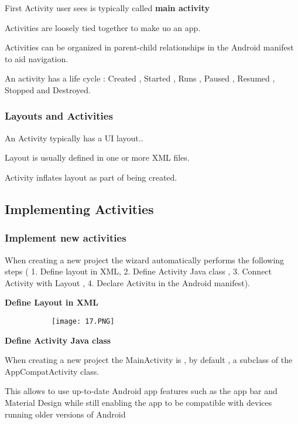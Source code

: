 \documentclass{article}
\begin{document}
  First Activity user sees is typically called \textbf{main activity}

  Activities are loosely tied together to make uo an app.

  Activities can be organized in parent-child relationships in the Android manifest to aid navigation.

  An activity has a life cycle : Created , Started , Runs , Paused , Resumed , Stopped and Destroyed.

\subsubsection{Layouts and Activities}

An Activity typically has a UI layout..

Layout is usually defined in one or more XML files.

Activity inflates layout as part of being created.

\subsection{Implementing Activities}

\subsubsection{Implement new activities}

When creating a new project the wizard automatically performs the following steps ( 1. Define layout in XML, 2. Define Activity Java class , 3. Connect Activity with Layout , 4. Declare Activitu in the Android manifest).


\textbf{Define Layout in XML}

    \begin{figure}[ht!]
  \centering
  \begin{subfigure}[b]{0.5\linewidth}
    \texttt{[image: 17.PNG]}
  \end{subfigure}
  \end{figure}

  \textbf{Define Activity Java class}

When creating a new project the MainActivity is , by default , a subclass of the AppCompatActivity class.

This allows to use up-to-date Android app features such as the app bar and Material Design while still enabling the app to be compatible with devices running older versions of Android
\end{document}
